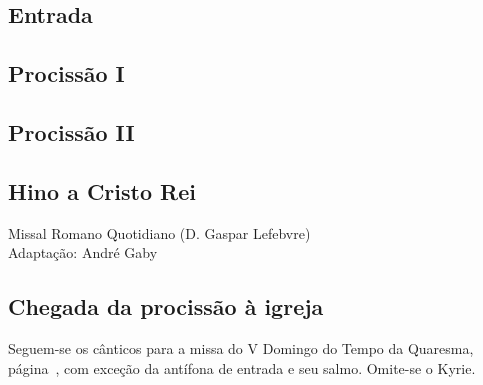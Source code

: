 
\subsection{Entrada}\label{subsection:hebdomada-sancta/dominica-in-palmis-de-passione-domini/introitus}

\AllowPageBreak

\subsection{Procissão I}\label{subsection:hebdomada-sancta/dominica-in-palmis-de-passione-domini/ad-processionem-1}

\AllowPageFlush

\subsection{Procissão II}\label{subsection:hebdomada-sancta/dominica-in-palmis-de-passione-domini/ad-processionem-2}

\subsection{Hino a Cristo Rei}\label{subsection:hebdomada-sancta/dominica-in-palmis-de-passione-domini/hymnus-ad-christum-regem}
\begin{annotation}
  Missal Romano Quotidiano (D. Gaspar Lefebvre) \\
  Adaptação: André Gaby
\end{annotation}

\subsection{Chegada da procissão à igreja}\label{subsection:hebdomada-sancta/dominica-in-palmis-de-passione-domini/ingrediente-processione-in-ecclesiam}

\begin{rubrica}
  Seguem-se os cânticos para a missa do V Domingo do Tempo da Quaresma, página~\pageref{section:tempus-quadragesimae/dominica-5}, com exceção da antífona de entrada e seu salmo. Omite-se o Kyrie.
\end{rubrica}